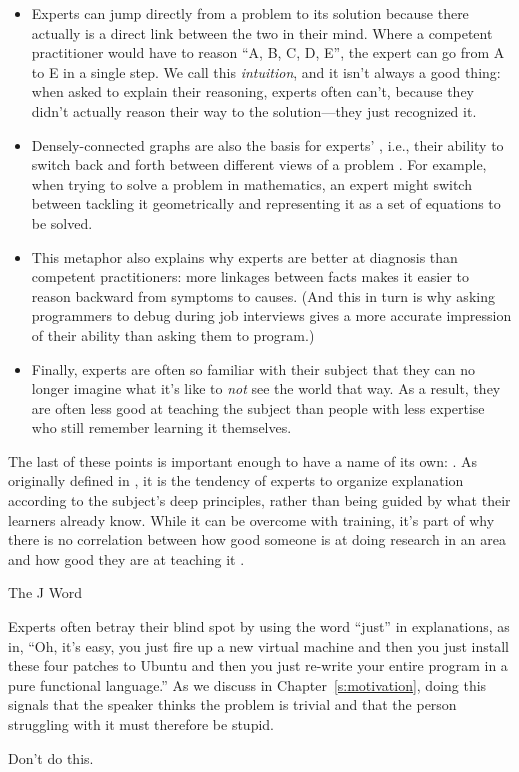 \begin{itemize}
\item
  Experts can jump directly from a problem to its solution because
  there actually is a direct link between the two in their mind. Where
  a competent practitioner would have to reason ``A, B, C, D, E'', the
  expert can go from A to E in a single step. We call this
  \emph{intuition}, and it isn't always a good thing: when asked to explain
  their reasoning, experts often can't, because they didn't actually
  reason their way to the solution---they just recognized it.
\item
  Densely-connected graphs are also the basis for experts'
  , i.e.,
  their ability to switch back and forth between different views of a
  problem \cite{Petr2016}. For example, when trying to solve a
  problem in mathematics, an expert might switch between tackling it
  geometrically and representing it as a set of equations to be
  solved.
\item
  This metaphor also explains why experts are better at diagnosis than
  competent practitioners: more linkages between facts makes it easier
  to reason backward from symptoms to causes. (And this in turn is why
  asking programmers to debug during job interviews gives a more
  accurate impression of their ability than asking them to program.)
\item
  Finally, experts are often so familiar with their subject that they
  can no longer imagine what it's like to \emph{not} see the world that
  way. As a result, they are often less good at teaching the subject
  than people with less expertise who still remember learning it
  themselves.
\end{itemize}

The last of these points is important enough to have a name of its own:
. As originally
defined in \cite{Nath2003}, it is the tendency of experts to organize
explanation according to the subject's deep principles, rather than
being guided by what their learners already know. While it can be
overcome with training, it's part of why there is no correlation between
how good someone is at doing research in an area and how good they are
at teaching it \cite{Mars2002}.

\begin{aside}{The J Word}

Experts often betray their blind spot by using the word ``just'' in
explanations, as in, ``Oh, it's easy, you just fire up a new virtual
machine and then you just install these four patches to Ubuntu and
then you just re-write your entire program in a pure functional
language.'' As we discuss in Chapter~\ref{s:motivation}, doing this
signals that the speaker thinks the problem is trivial and that the
person struggling with it must therefore be stupid.

Don't do this.

\end{aside}

